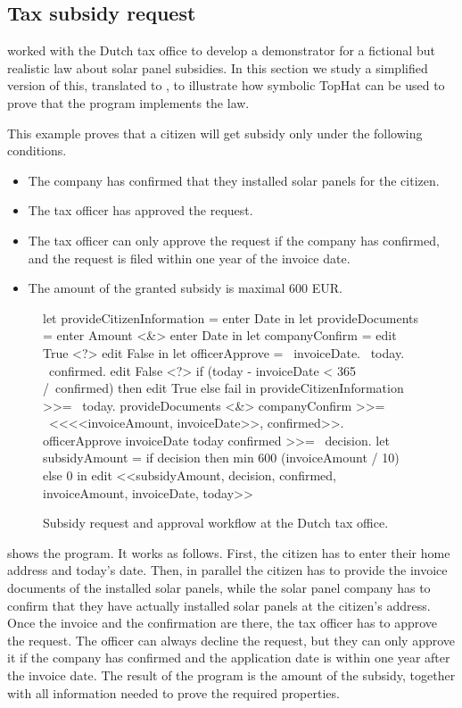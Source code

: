 \subsection{Tax subsidy request}

\citet{conf/sfp/StutterheimAP17} worked with the Dutch tax office to develop a demonstrator for a fictional but realistic law about solar panel subsidies.
In this section we study a simplified version of this, translated to \TOPHAT, to illustrate how symbolic TopHat can be used to prove that the program implements the law.

This example proves that a citizen will get subsidy only under the following conditions.
\begin{itemize}
\item The company has confirmed that they installed solar panels for the citizen.
\item The tax officer has approved the request.
\item The tax officer can only approve the request if the company has confirmed, and the request is filed within one year of the invoice date.
\item The amount of the granted subsidy is maximal 600 EUR.
\end{itemize}

\begin{figure}
\begin{TASK}
  let provideCitizenInformation = enter Date in
  let provideDocuments = enter Amount <&> enter Date in
  let companyConfirm = edit True <?> edit False in
  let officerApprove = \ invoiceDate. \ today. \ confirmed.
    edit False <?> if (today - invoiceDate < 365 /\ confirmed)
      then edit True else fail in
  provideCitizenInformation >>= \ today.
  provideDocuments <&> companyConfirm >>= \ <<<<invoiceAmount,
    invoiceDate>>, confirmed>>.
  officerApprove invoiceDate today confirmed >>= \ decision.
  let subsidyAmount = if decision
    then min 600 (invoiceAmount / 10) else 0 in
  edit <<subsidyAmount, decision, confirmed, invoiceAmount,
    invoiceDate, today>>
\end{TASK}
\caption{Subsidy request and approval workflow at the Dutch tax office.}
\label{fig:thetaxman}
\end{figure}

 shows the program.
It works as follows.
First, the citizen has to enter their home address and today's date.
Then, in parallel the citizen has to provide the invoice documents of the installed solar panels, while the solar panel company has to confirm that they have actually installed solar panels at the citizen's address.
Once the invoice and the confirmation are there, the tax officer has to approve the request.
The officer can always decline the request, but they can only approve it if the company has confirmed and the application date is within one year after the invoice date.
The result of the program is the amount of the subsidy, together with all information needed to prove the required properties.



